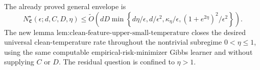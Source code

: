 The already proved general envelope is
\[
N^\star_{\mathfrak E}(\epsilon;d,C,D,\eta)
\le\widetilde O\!\left(dD\min\left\{d\eta/\epsilon,d/\epsilon^2,\kappa_\eta/\epsilon,(1+e^{2\eta})^2/\epsilon^2\right\}\right).
\]
The new lemma \(\text{lem:clean-feature-upper-small-temperature}\) closes the desired universal clean-temperature rate throughout the nontrivial subregime \(0<\eta\le1\), using the same computable empirical-risk-minimizer Gibbs learner and without supplying \(C\) or \(D\). The residual question is confined to \(\eta>1\).